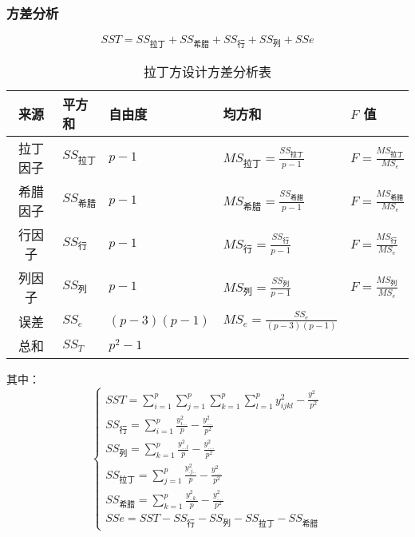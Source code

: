 \subsubsection{方差分析}
\begin{equation*}
	SST=SS_{\text{拉丁}}+SS_{\text{希腊}}+SS_{\text{行}}+SS_{\text{列}}+SSe
\end{equation*}
\begin{table}[H] 
	\centering
	\begin{tabularx}{\textwidth}{c|>{\centering\arraybackslash}X>{\centering\arraybackslash}X>{\centering\arraybackslash}X>{\centering\arraybackslash}X}
		\toprule
		来源   & 平方和 & 自由度 & 均方和 & $F$ 值 \\ 
		\midrule
		拉丁因子 & $SS_\text{拉丁}$ & $p-1$ & $MS_\text{拉丁}= \frac{SS_\text{拉丁}}{p-1}$ & $F = \frac{MS_\text{拉丁}}{MS_e}$ \\ 
		希腊因子 & $SS_\text{希腊}$ & $p-1$ & $MS_\text{希腊}= \frac{SS_\text{希腊}}{p-1}$ & $F = \frac{MS_\text{希腊}}{MS_e}$ \\ 
		行因子   & $SS_\text{行}$ & $p-1$ & $MS_\text{行} = \frac{SS_\text{行}}{p-1}$ & $F = \frac{MS_\text{行}}{MS_e}$ \\ 
		列因子   & $SS_\text{列}$ & $p-1$ & $MS_\text{列}=\frac{SS_\text{列}}{p-1}$ & $F = \frac{MS_\text{列}}{MS_e}$ \\ 
		误差     & $SS_e$ & $(p-3)(p-1)$ & $MS_e = \frac{SS_e}{(p-3)(p-1)}$ & \\ 
		总和     & $SS_T$ & $p^2-1$ & & \\ 
		\bottomrule
	\end{tabularx}
	\caption{拉丁方设计方差分析表}
\end{table}
其中：
\begin{equation*}
	\begin{cases}
		SST=\sum\limits_{i=1}^p\sum\limits_{j=1}^p\sum\limits_{k=1}^p\sum\limits_{l=1}^py_{ijkl}^2-\frac{y_{....}^2}{p^2} \\
		SS_\text{行}=\sum\limits_{i=1}^p\frac{y_{i...}^2}{p}-\frac{y_{....}^2}{p^2} \\
		SS_\text{列}=\sum\limits_{k=1}^p\frac{y_{...l}^2}{p}-\frac{y_{....}^2}{p^2} \\
		SS_\text{拉丁}=\sum\limits_{j=1}^p\frac{y_{.j..}^2}{p}-\frac{y_{....}^2}{p^2} \\
		SS_\text{希腊}=\sum\limits_{k=1}^p\frac{y_{..k.}^2}{p}-\frac{y_{....}^2}{p^2} \\
		SSe=SST-SS_\text{行}-SS_\text{列}-SS_\text{拉丁}-SS_\text{希腊}
	\end{cases}
\end{equation*}
